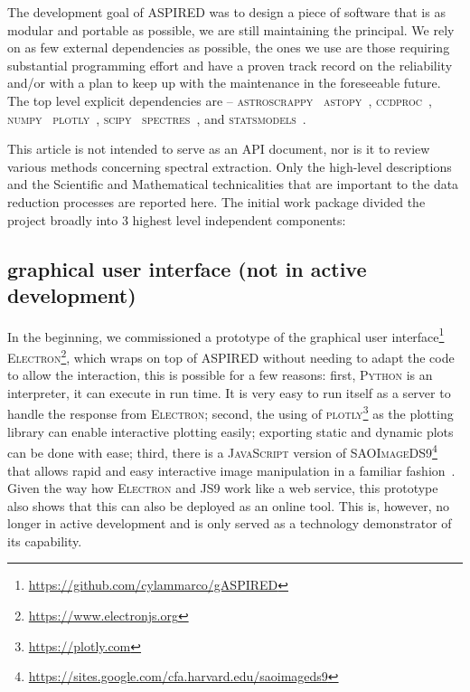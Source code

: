 \documentclass[fleqn,usenatbib]{mnras}
\begin{document}
The development goal of ASPIRED was to design a piece of software that is as modular and
portable as possible, we are still maintaining the principal. We rely on as few
external dependencies as possible, the ones we use are those requiring substantial
programming effort and have a proven track record on the reliability and/or
with a plan to keep up with the maintenance  in the foreseeable future. The top
level explicit dependencies are --
\textsc{astroscrappy}~\citep{curtis_mccully_2018_1482019, 2001PASP..113.1420V}
\textsc{astopy}~\citep{astropy:2013, astropy:2018},
\textsc{ccdproc}~\citep{matt_craig_2017_1069648},
\textsc{numpy}~\citep{2020NumPy-Array}
\textsc{plotly}~\citep{plotly},
\textsc{scipy}~\citep{2020SciPy-NMeth}
\textsc{spectres}~\citep{2017arXiv170505165C}, and
\textsc{statsmodels}~\citep{seabold2010statsmodels}. 

This article is not intended to serve as an API document, nor is it to review
various methods concerning spectral extraction. Only the high-level
descriptions and the Scientific and Mathematical technicalities that are
important to the data reduction processes are reported here. The initial
work package divided the project broadly into 3 highest level independent
components:

\subsection*{graphical user interface (not in active development)}
In the beginning, we commissioned a prototype of the graphical user
interface\footnote{\url{https://github.com/cylammarco/gASPIRED}}
\textsc{Electron}\footnote{\url{https://www.electronjs.org}}, which wraps on top of
\textsc{ASPIRED} without needing to adapt the code to allow the interaction, this is
possible for a few reasons: first, \textsc{Python} is an interpreter, it can execute
in run time. It is very easy to run itself as a server to handle the response from 
\textsc{Electron}; second, the using of
\textsc{plotly}\footnote{\url{https://plotly.com}} as the plotting
library can enable interactive plotting easily; exporting static and dynamic plots
can be done with ease; third, there is a \textsc{JavaScript} version of
\textsc{SAOImageDS9}\footnote{\url{https://sites.google.com/cfa.harvard.edu/saoimageds9}}
that allows rapid and easy interactive image manipulation in a familiar
fashion~\citep{eric_mandel_2021_596052}. Given the way how \textsc{Electron} and
\textsc{JS9} work like a web service, this prototype also shows that this can also
be deployed as an online tool. This is, however, no longer in active development
and is only served as a technology demonstrator of its capability.
\end{document}
